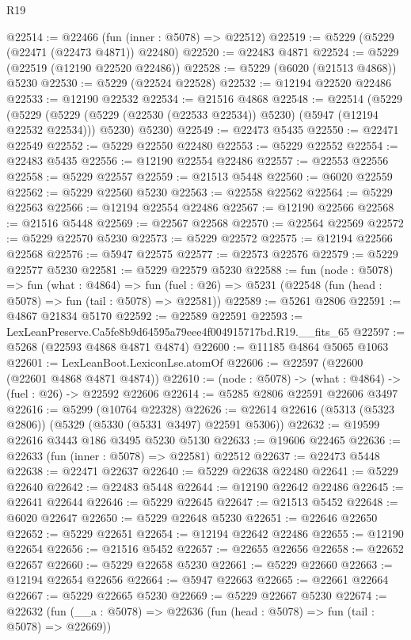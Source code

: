 \begin{lexlean}{R19}
\begin{coremodule}
@22514 := @22466 (fun (inner : @5078) => @22512)
@22519 := @5229 (@5229 (@22471 (@22473 @4871)) @22480)
@22520 := @22483 @4871
@22524 := @5229 (@22519 (@12190 @22520 @22486))
@22528 := @5229 (@6020 (@21513 @4868)) @5230
@22530 := @5229 (@22524 @22528)
@22532 := @12194 @22520 @22486
@22533 := @12190 @22532
@22534 := @21516 @4868
@22548 := @22514
    (@5229
      (@5229 (@5229 (@5229 (@22530 (@22533 @22534)) @5230) (@5947 (@12194 @22532 @22534))) @5230)
      @5230)
@22549 := @22473 @5435
@22550 := @22471 @22549
@22552 := @5229 @22550 @22480
@22553 := @5229 @22552
@22554 := @22483 @5435
@22556 := @12190 @22554 @22486
@22557 := @22553 @22556
@22558 := @5229 @22557
@22559 := @21513 @5448
@22560 := @6020 @22559
@22562 := @5229 @22560 @5230
@22563 := @22558 @22562
@22564 := @5229 @22563
@22566 := @12194 @22554 @22486
@22567 := @12190 @22566
@22568 := @21516 @5448
@22569 := @22567 @22568
@22570 := @22564 @22569
@22572 := @5229 @22570 @5230
@22573 := @5229 @22572
@22575 := @12194 @22566 @22568
@22576 := @5947 @22575
@22577 := @22573 @22576
@22579 := @5229 @22577 @5230
@22581 := @5229 @22579 @5230
@22588 := fun (node : @5078) =>
  fun (what : @4864) =>
  fun (fuel : @26) => @5231 (@22548 (fun (head : @5078) => fun (tail : @5078) => @22581))
@22589 := @5261 @2806
@22591 := @4867 @21834 @5170
@22592 := @22589 @22591
@22593 := LexLeanPreserve.Ca5fe8b9d64595a79eee4f004915717bd.R19.__fits_65
@22597 := @5268 (@22593 @4868 @4871 @4874)
@22600 := @11185 @4864 @5065 @1063
@22601 := LexLeanBoot.LexiconLse.atomOf
@22606 := @22597 (@22600 (@22601 @4868 @4871 @4874))
@22610 := (node : @5078) -> (what : @4864) -> (fuel : @26) -> @22592 @22606
@22614 := @5285 @2806 @22591 @22606 @3497
@22616 := @5299 (@10764 @22328)
@22626 := @22614 @22616 (@5313 (@5323 @2806)) (@5329 (@5330 (@5331 @3497) @22591 @5306))
@22632 := @19599 @22616 @3443 @186 @3495 @5230 @5130
@22633 := @19606 @22465
@22636 := @22633 (fun (inner : @5078) => @22581) @22512
@22637 := @22473 @5448
@22638 := @22471 @22637
@22640 := @5229 @22638 @22480
@22641 := @5229 @22640
@22642 := @22483 @5448
@22644 := @12190 @22642 @22486
@22645 := @22641 @22644
@22646 := @5229 @22645
@22647 := @21513 @5452
@22648 := @6020 @22647
@22650 := @5229 @22648 @5230
@22651 := @22646 @22650
@22652 := @5229 @22651
@22654 := @12194 @22642 @22486
@22655 := @12190 @22654
@22656 := @21516 @5452
@22657 := @22655 @22656
@22658 := @22652 @22657
@22660 := @5229 @22658 @5230
@22661 := @5229 @22660
@22663 := @12194 @22654 @22656
@22664 := @5947 @22663
@22665 := @22661 @22664
@22667 := @5229 @22665 @5230
@22669 := @5229 @22667 @5230
@22674 := @22632 (fun (__a : @5078) => @22636 (fun (head : @5078) => fun (tail : @5078) => @22669))

\end{coremodule}
\end{lexlean}
